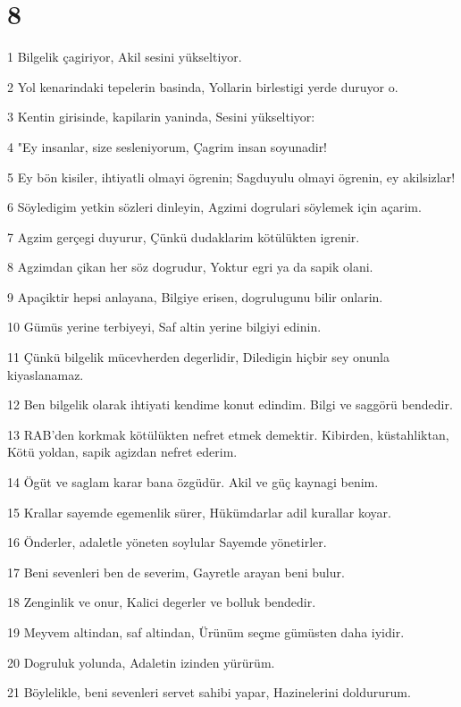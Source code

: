 \chapter{8}

\par 1 Bilgelik çagiriyor, Akil sesini yükseltiyor.
\par 2 Yol kenarindaki tepelerin basinda, Yollarin birlestigi yerde duruyor o.
\par 3 Kentin girisinde, kapilarin yaninda, Sesini yükseltiyor:
\par 4 "Ey insanlar, size sesleniyorum, Çagrim insan soyunadir!
\par 5 Ey bön kisiler, ihtiyatli olmayi ögrenin; Sagduyulu olmayi ögrenin, ey akilsizlar!
\par 6 Söyledigim yetkin sözleri dinleyin, Agzimi dogrulari söylemek için açarim.
\par 7 Agzim gerçegi duyurur, Çünkü dudaklarim kötülükten igrenir.
\par 8 Agzimdan çikan her söz dogrudur, Yoktur egri ya da sapik olani.
\par 9 Apaçiktir hepsi anlayana, Bilgiye erisen, dogrulugunu bilir onlarin.
\par 10 Gümüs yerine terbiyeyi, Saf altin yerine bilgiyi edinin.
\par 11 Çünkü bilgelik mücevherden degerlidir, Diledigin hiçbir sey onunla kiyaslanamaz.
\par 12 Ben bilgelik olarak ihtiyati kendime konut edindim. Bilgi ve saggörü bendedir.
\par 13 RAB'den korkmak kötülükten nefret etmek demektir. Kibirden, küstahliktan, Kötü yoldan, sapik agizdan nefret ederim.
\par 14 Ögüt ve saglam karar bana özgüdür. Akil ve güç kaynagi benim.
\par 15 Krallar sayemde egemenlik sürer, Hükümdarlar adil kurallar koyar.
\par 16 Önderler, adaletle yöneten soylular Sayemde yönetirler.
\par 17 Beni sevenleri ben de severim, Gayretle arayan beni bulur.
\par 18 Zenginlik ve onur, Kalici degerler ve bolluk bendedir.
\par 19 Meyvem altindan, saf altindan, Ürünüm seçme gümüsten daha iyidir.
\par 20 Dogruluk yolunda, Adaletin izinden yürürüm.
\par 21 Böylelikle, beni sevenleri servet sahibi yapar, Hazinelerini doldururum.

